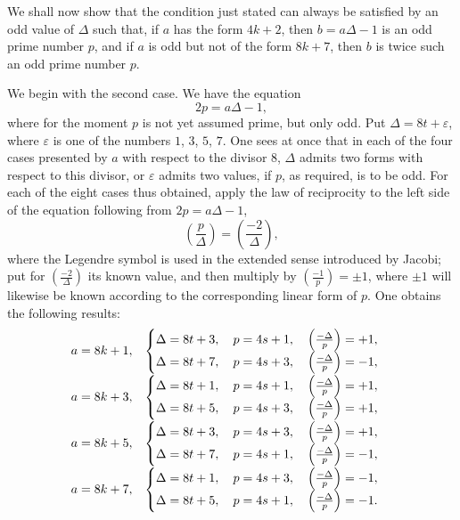 \documentclass[11pt]{article}
\newcommand{\leg}[2]{\left(\frac{#1}{#2}\right)}
\begin{document}
We shall now show that the condition just stated can always be satisfied by an odd value of $\Delta$ such that, if $a$ has the form $4k+2$, then $b=a\Delta-1$ is an odd prime number $p$, and if $a$ is odd but not of the form $8k+7$, then $b$ is twice such an odd prime number $p$.

We begin with the second case. We have the equation
\[
 2p=a\Delta-1,
\]
where for the moment $p$ is not yet assumed prime, but only odd. Put $\Delta=8t+\varepsilon$, where $\varepsilon$ is one of the numbers $1$, $3$, $5$, $7$. One sees at once that in each of the four cases presented by $a$ with respect to the divisor $8$, $\Delta$ admits two forms with respect to this divisor, or $\varepsilon$ admits two values, if $p$, as required, is to be odd. For each of the eight cases thus obtained, apply the law of reciprocity to the left side of the equation following from $2p=a\Delta-1$,
\[
 \leg{p}{\Delta}=\leg{-2}{\Delta},
\]
where the Legendre symbol is used in the extended sense introduced by Jacobi; put for $\leg{-2}{\Delta}$ its known value, and then multiply by $\leg{-1}{p}=\pm1$, where $\pm1$ will likewise be known according to the corresponding linear form of $p$. One obtains the following results:
\[
\begin{array}{r@{\quad}l}
 a=8k+1, &
 \begin{cases}
 \Delta=8t+3,\quad p=4s+1,\quad \leg{-\Delta}{p}=+1,\\
 \Delta=8t+7,\quad p=4s+3,\quad \leg{-\Delta}{p}=-1,
 \end{cases}\\[1.3em]
 a=8k+3, &
 \begin{cases}
 \Delta=8t+1,\quad p=4s+1,\quad \leg{-\Delta}{p}=+1,\\
 \Delta=8t+5,\quad p=4s+3,\quad \leg{-\Delta}{p}=+1,
 \end{cases}\\[1.3em]
 a=8k+5, &
 \begin{cases}
 \Delta=8t+3,\quad p=4s+3,\quad \leg{-\Delta}{p}=+1,\\
 \Delta=8t+7,\quad p=4s+1,\quad \leg{-\Delta}{p}=-1,
 \end{cases}\\[1.3em]
 a=8k+7, &
 \begin{cases}
 \Delta=8t+1,\quad p=4s+3,\quad \leg{-\Delta}{p}=-1,\\
 \Delta=8t+5,\quad p=4s+1,\quad \leg{-\Delta}{p}=-1.
 \end{cases}
\end{array}
\]
\end{document}
